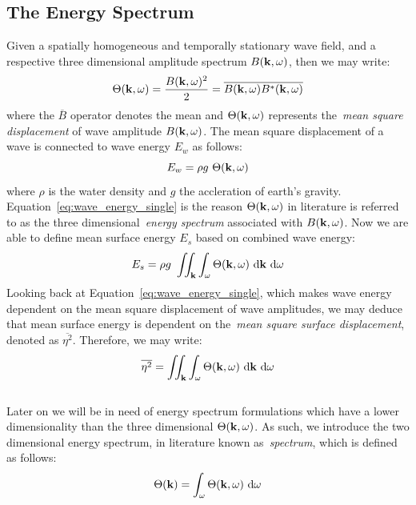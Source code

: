 \subsection{The Energy Spectrum}
\label{sec:energy_spectrum}
Given a spatially homogeneous and temporally stationary wave field, and a
respective three dimensional amplitude spectrum $B(\mathbf{k},\omega)$, then we
may write:
\begin{equation}
\label{eq:energy_spectrum_3d}
 \Theta(\mathbf{k}, \omega) = \frac{B(\mathbf{k}, \omega)^2}{2} = 
\overline{B(\mathbf{k}, \omega)B^{*}(\mathbf{k}, \omega)}
\end{equation}
where the $\overline{B}$ operator denotes the mean and
$\Theta(\mathbf{k},\omega)$ represents the~\emph{mean square displacement} of
wave amplitude $B(\mathbf{k},\omega)$. The mean square displacement of a wave
is connected to wave energy $E_w$ as follows:
%
\begin{equation}
\label{eq:wave_energy_single}
 E_w = \rho g~\Theta(\mathbf{k},\omega)
\end{equation}
%
where $\rho$ is the water density and $g$ the accleration of earth's gravity.
Equation~\ref{eq:wave_energy_single} is the reason $\Theta(\mathbf{k},\omega)$
in literature is referred to as the three dimensional~\emph{energy spectrum}
associated with $B(\mathbf{k},\omega)$. Now we are able to define mean surface
energy $E_s$ based on combined wave energy:
%
\begin{equation}
\label{eq:wave_energy_3d}
 E_s = \rho g~\iint_{\mathbf{k}}\int_{\omega}\Theta(\mathbf{k},\omega)
~\mathrm{d}\mathbf{k}~\mathrm{ d}\omega
\end{equation}
%
Looking back at Equation~\ref{eq:wave_energy_single}, which makes wave energy
dependent on the mean square displacement of wave amplitudes, we may deduce that
mean surface energy is dependent on the~\emph{mean square surface displacement},
denoted as $\overline{\eta^2}$. Therefore, we may write:
%
\begin{equation}
\label{eq:mean_square_eta}
\overline{\eta^2} = \iint_{\mathbf{k}}\int_{\omega}\Theta(\mathbf{k},\omega)
~\mathrm{d}\mathbf{k}~\mathrm{d}\omega
\end{equation}
%
\\
Later on we will be in need of energy spectrum formulations which have a lower
dimensionality than the three dimensional $\Theta(\mathbf{k},\omega)$. As such,
we introduce the two dimensional energy spectrum, in literature known
as~\emph{\wavenumber spectrum}, which is defined as follows:
\begin{equation}
\label{eq:energy_spectrum_2d}
 \Theta(\mathbf{k}) = \int_{\omega} \Theta(\mathbf{k}, \omega)~\mathrm{d}\omega
\end{equation}
